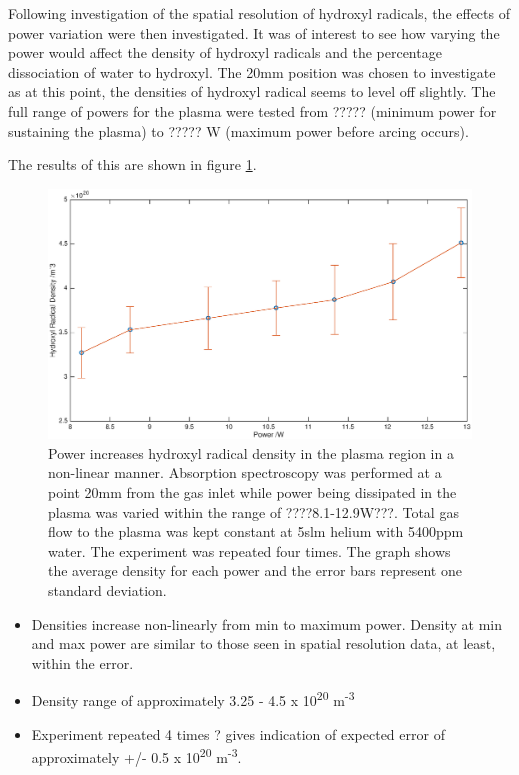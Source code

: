 \documentclass[11pt, oneside]{article}   	%
\begin{document}
Following investigation of the spatial resolution of hydroxyl radicals, the effects of power variation were then investigated.
It was of interest to see how varying the power would affect the density of hydroxyl radicals and the percentage dissociation of water to hydroxyl.
The 20mm position was chosen to investigate as at this point, the densities of hydroxyl radical seems to level off slightly. 
The full range of powers for the plasma were tested from ????? (minimum power for sustaining the plasma) to ????? W (maximum power before arcing occurs).

The results of this are shown in figure \ref{fig:PowerVariation}.

\begin{figure}
    \centering
    \includegraphics[width=\textwidth]{Figures/PowerVariation.eps}
    \caption{Power increases hydroxyl radical density in the plasma region in a non-linear manner. Absorption spectroscopy was performed at a point 20mm from the gas inlet while power being dissipated in the plasma was varied within the range of ????8.1-12.9W???. Total gas flow to the plasma was kept constant at 5slm helium with 5400ppm water. The experiment was repeated four times. The graph shows the average density for each power and the error bars represent one standard deviation.}
    \label{fig:PowerVariation}
\end{figure}

\begin{itemize}
    \item Densities increase non-linearly from min to maximum power.  Density at min and max power are similar to those seen in spatial resolution data, at least, within the error.
    \item Density range of approximately 3.25 - 4.5 x 10\textsuperscript{20} m\textsuperscript{-3}
    \item Experiment repeated 4 times ? gives indication of expected error of approximately +/- 0.5 x 10\textsuperscript{20} m\textsuperscript{-3}.
\end{itemize}
\end{document}
